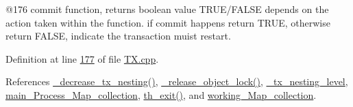 @176 commit function, returns boolean value T\+R\+U\+E/\+F\+A\+L\+SE depends on the action taken within the function. if commit happens return T\+R\+UE, otherwise return F\+A\+L\+SE, indicate the transaction muist restart. 



Definition at line \hyperlink{_t_x_8cpp_source_l00177}{177} of file \hyperlink{_t_x_8cpp_source}{T\+X.\+cpp}.



References \hyperlink{_t_x_8cpp_source_l00279}{\+\_\+decrease\+\_\+tx\+\_\+nesting()}, \hyperlink{_t_x_8cpp_source_l00253}{\+\_\+release\+\_\+object\+\_\+lock()}, \hyperlink{_t_x_8h_source_l00101}{\+\_\+tx\+\_\+nesting\+\_\+level}, \hyperlink{_t_x_8h_source_l00105}{main\+\_\+\+Process\+\_\+\+Map\+\_\+collection}, \hyperlink{_t_x_8cpp_source_l00052}{th\+\_\+exit()}, and \hyperlink{_t_x_8h_source_l00093}{working\+\_\+\+Map\+\_\+collection}.


